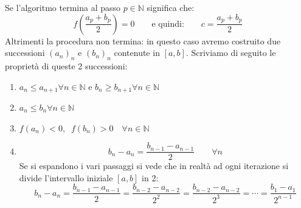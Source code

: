 {\begin{enumerate}
  \end{enumerate}

  Se l'algoritmo termina al passo $p \in \mathbb{N}$ significa che:
  \begin{equation*}
    f\left(\dfrac{a_p + b_p}{2}\right) = 0 \qquad \text{e quindi:} \qquad c = \dfrac{a_p + b_p}{2}
  \end{equation*}
  Altrimenti la procedura non termina: in questo caso avremo costruito due successioni $(a_n)_n$ e $(b_n)_n$ contenute in $[a, b]$. Scriviamo di seguito le proprietà di queste 2 successioni:
  \begin{enumerate}[label=\roman*.]
    \item $a_n \leq a_{n+1} \forall n \in \mathbb{N}$ \quad e \quad $b_n \geq b_{n+1} \forall n \in \mathbb{N}$

    \item $a_n \leq b_n \forall n \in \mathbb{N}$ 
      
    \item $f(a_n) < 0, \;\; f(b_n) > 0 \quad \forall n \in \mathbb{N}$
    
    \item 
      \begin{equation*}
        b_n - a_n = \dfrac{b_{n-1} - a_{n-1}}{2} \qquad \forall n
      \end{equation*}
      Se si espandono i vari passaggi si vede che in realtà ad ogni iterazione si divide l'intervallo iniziale $[a, b]$ in 2:
      \begin{equation*}
        b_n - a_n = \dfrac{b_{n-1} - a_{n-1}}{2} = \dfrac{b_{n-2} - a_{n-2}}{2^2} = \dfrac{b_{n-2} - a_{n-2}}{2^3}  = \cdots = \dfrac{b_1 - a_1}{2^{n-1}}
      \end{equation*}
  \end{enumerate}

}
